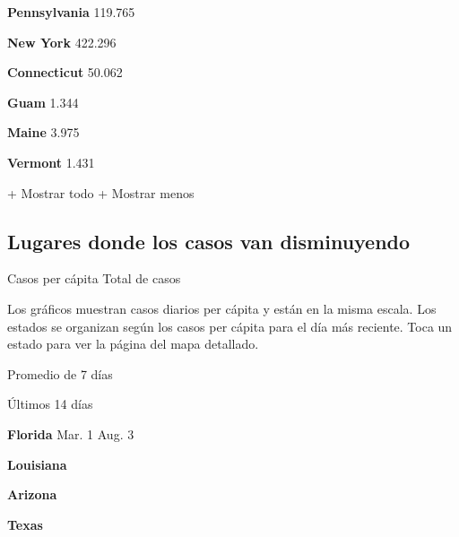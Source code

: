 \textbf{Pennsylvania} 119.765

\href{https://www.nytimes3xbfgragh.onion/interactive/2020/us/new-york-coronavirus-cases.html}{}

\textbf{New York} 422.296

\href{https://www.nytimes3xbfgragh.onion/interactive/2020/us/connecticut-coronavirus-cases.html}{}

\textbf{Connecticut} 50.062

\textbf{Guam} 1.344

\href{https://www.nytimes3xbfgragh.onion/interactive/2020/us/maine-coronavirus-cases.html}{}

\textbf{Maine} 3.975

\href{https://www.nytimes3xbfgragh.onion/interactive/2020/us/vermont-coronavirus-cases.html}{}

\textbf{Vermont} 1.431

+ Mostrar todo + Mostrar menos

\hypertarget{lugares-donde-los-casos-van-disminuyendo}{%
\subsection{Lugares donde los casos van
disminuyendo}\label{lugares-donde-los-casos-van-disminuyendo}}

Casos per cápita Total de casos

Los gráficos muestran casos diarios per cápita y están en la misma
escala. Los estados se organizan según los casos per cápita para el día
más reciente. Toca un estado para ver la página del mapa detallado.

\href{https://www.nytimes3xbfgragh.onion/interactive/2020/us/florida-coronavirus-cases.html}{}

Promedio de 7 días

Últimos 14 días

\textbf{Florida} Mar. 1 Aug. 3

\href{https://www.nytimes3xbfgragh.onion/interactive/2020/us/louisiana-coronavirus-cases.html}{}

\textbf{Louisiana}

\href{https://www.nytimes3xbfgragh.onion/interactive/2020/us/arizona-coronavirus-cases.html}{}

\textbf{Arizona}

\href{https://www.nytimes3xbfgragh.onion/interactive/2020/us/texas-coronavirus-cases.html}{}

\textbf{Texas}

